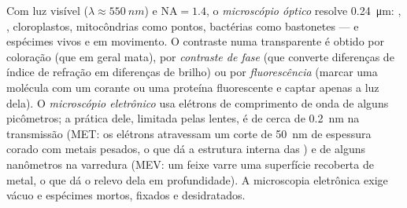 \begin{proposition}\label{prop:b1:cell-unit-of-life:microscopes}
Com luz visível ($\lambda \approx \qty{550}{nm}$) e $\mathrm{NA} = 1.4$,
o \emph{microscópio óptico} resolve
\qty{0.24}{\micro m}: , , cloroplastos, mitocôndrias como
pontos, bactérias como bastonetes --- e espécimes vivos e em movimento.
O contraste numa  transparente é obtido por coloração (que em
geral mata), por \emph{contraste de fase} (que converte diferenças de
índice de refração em diferenças de brilho) ou por
\emph{fluorescência} (marcar uma molécula com um corante ou uma proteína
fluorescente e captar apenas a luz dela). O
\emph{microscópio eletrônico} usa elétrons
de comprimento de onda de alguns picômetros; a  prática dele,
limitada pelas lentes, é de cerca de \qty{0.2}{nm} na transmissão (MET:
os elétrons atravessam um corte de \qty{50}{nm} de espessura corado com
metais pesados, o que dá a estrutura interna das ) e de alguns
nanômetros na varredura (MEV: um feixe varre uma superfície recoberta de
metal, o que dá o relevo dela em profundidade). A microscopia eletrônica
exige vácuo e espécimes mortos, fixados e desidratados.
\end{proposition}

